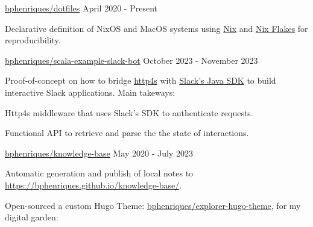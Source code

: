 
\begin{cventries}
  \openSourceEntry
    {\href{https://github.com/bphenriques/dotfiles}{bphenriques/dotfiles}}
    {April 2020 - Present}
    {
    \begin{openSourceDescription}
    Declarative definition of NixOS and MacOS systems using \href{https://nixos.org/}{Nix} and \href{https://nixos.wiki/wiki/Flakes}{Nix Flakes} for reproducibility.
    \end{openSourceDescription}
    \vspace{4mm}
    }

  \vspace{2mm}

\openSourceEntry
    {\href{https://github.com/bphenriques/scala-example-slack-bot}{bphenriques/scala-example-slack-bot}}
    {October 2023 - November 2023}
    {   
    \begin{openSourceDescription}
    Proof-of-concept on how to bridge \href{https://github.com/http4s/http4s}{http4s} with \href{https://github.com/slackapi/java-slack-sdk}{Slack's Java SDK} to build interactive Slack applications. Main takeways:
    \end{openSourceDescription}
    \vspace{8mm}
    \begin{openSourceItems}
        \item Http4s middleware that uses Slack's SDK to authenticate requests.
        \item Functional API to retrieve and parse the the state of interactions.
    \end{openSourceItems}
    \vspace{4mm}
    }

  \vspace{2mm}  

  \openSourceEntry
    {\href{https://github.com/bphenriques/knowledge-base}{bphenriques/knowledge-base}}
    {May 2020 - July 2023}
    {    
    \begin{openSourceItems}
        \item Automatic generation and publish of local notes to \href{https://bphenriques.github.io/knowledge-base/}{https://bphenriques.github.io/knowledge-base/}.
        \item Open-sourced a custom Hugo Theme: \href{https://github.com/bphenriques/explorer-hugo-theme}{bphenriques/explorer-hugo-theme}, for my digital garden:
    \end{openSourceItems}
    \vspace{4mm}
    }


\end{cventries}
